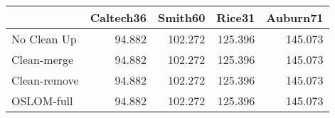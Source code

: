 \begin{tabular}{lrrrr}
\toprule
{} & Caltech36 & Smith60 &  Rice31 & Auburn71 \\
\midrule
No Clean Up  &    94.882 & 102.272 & 125.396 &  145.073 \\
Clean-merge  &    94.882 & 102.272 & 125.396 &  145.073 \\
Clean-remove &    94.882 & 102.272 & 125.396 &  145.073 \\
OSLOM-full   &    94.882 & 102.272 & 125.396 &  145.073 \\
\bottomrule
\end{tabular}
